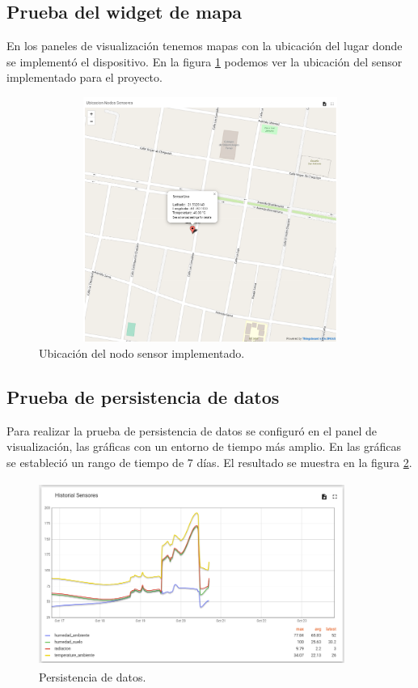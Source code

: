 \subsection{Prueba del widget de mapa}
En los paneles de visualización tenemos mapas con la ubicación del lugar donde se implementó el dispositivo.
En la figura \ref{fig:map thingsboard}  podemos ver la ubicación del sensor implementado para el proyecto.

\begin{figure}[h!]
  \centering
    \includegraphics[width=12cm, height=8cm]{./Figures/map.png}
  \caption{Ubicación del nodo sensor implementado.}
    \label{fig:map thingsboard}
\end{figure}

\subsection{Prueba de persistencia de datos}
Para realizar la prueba de persistencia de datos se configuró en el panel de visualización, las gráficas con un entorno de tiempo más amplio.
En las gráficas se estableció un rango de tiempo de 7 días. El resultado se muestra en la figura \ref{fig:Persistencia de datos}.

\begin{figure}[h!]
  \centering
    \includegraphics[width=10cm, height=6cm]{./Figures/historial_sensores.png}
  \caption{Persistencia de datos.}
    \label{fig:Persistencia de datos}
\end{figure}

